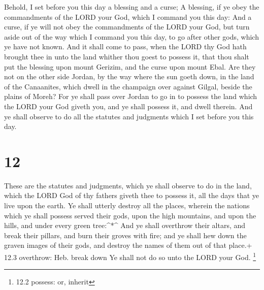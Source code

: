  Behold, I set before you this day a blessing and a curse;
 A blessing, if ye obey the commandments of the LORD your
God, which I command you this day:  And a curse, if ye will
not obey the commandments of the LORD your God, but turn aside out of
the way which I command you this day, to go after other gods, which ye
have not known.  And it shall come to pass, when the LORD
thy God hath brought thee in unto the land whither thou goest to possess
it, that thou shalt put the blessing upon mount Gerizim, and the curse
upon mount Ebal.  Are they not on the other side Jordan, by
the way where the sun goeth down, in the land of the Canaanites, which
dwell in the champaign over against Gilgal, beside the plains of Moreh?
 For ye shall pass over Jordan to go in to possess the land
which the LORD your God giveth you, and ye shall possess it, and dwell
therein.  And ye shall observe to do all the statutes and
judgments which I set before you this day.

\hypertarget{section-11}{%
\section{12}\label{section-11}}

 These are the statutes and judgments, which ye shall
observe to do in the land, which the LORD God of thy fathers giveth thee
to possess it, all the days that ye live upon the earth.  Ye
shall utterly destroy all the places, wherein the nations which ye shall
possess served their gods, upon the high mountains, and upon the hills,
and under every green tree:\^{}*\^{}  And ye shall overthrow
their altars, and break their pillars, and burn their groves with fire;
and ye shall hew down the graven images of their gods, and destroy the
names of them out of that place.+ 12.3 overthrow: Heb. break down
 Ye shall not do so unto the LORD your God. \footnote{12.2
  possess: or, inherit}

